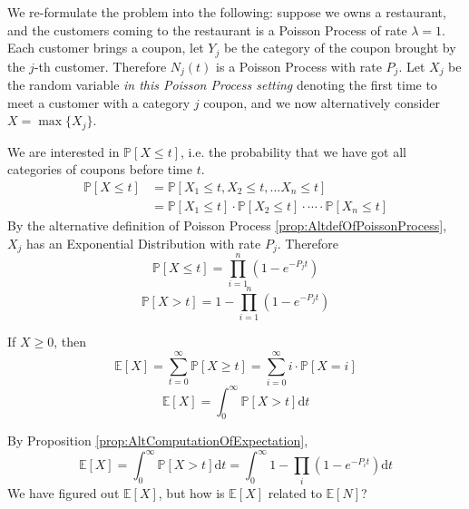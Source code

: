         We re-formulate the problem into the following: suppose we owns a restaurant, and the customers coming to the restaurant is a Poisson Process of rate $\lambda = 1$. Each customer brings a coupon, let $Y_j$ be the category of the coupon brought by the $j$-th customer. Therefore $N_j(t)$ is a Poisson Process with rate $P_j$. Let $X_j$ be the random variable \emph{in this Poisson Process setting} denoting the first time to meet a customer with a category $j$ coupon, and we now alternatively consider $X = \max \{X_j\}$.

        We are interested in $\mathbb{P}[X \le t]$, i.e. the probability that we have got all categories of coupons before time $t$.
        \begin{align*}
            \mathbb{P}[X \le t] &= \mathbb{P}[X_1 \le t, X_2 \le t, \dots X_n \le t]\\
            &= \mathbb{P}[X_1 \le t] \cdot \mathbb{P}[X_2 \le t] \cdot \cdots \cdot \mathbb{P}[X_n \le t]
        \end{align*}
        By the alternative definition of Poisson Process \ref{prop:AltdefOfPoissonProcess}, $X_j$ has an Exponential Distribution with rate $P_j$. Therefore
        \[ \mathbb{P}[X \le t] = \prod_{i=1}^n (1-e^{-P_jt}) \]
        \[ \mathbb{P}[X > t] = 1 - \prod_{i=1}^n (1-e^{-P_jt}) \]
        \begin{proposition}\label{prop:AltComputationOfExpectation}
            If $X \ge 0$, then
            \[ \mathbb{E}[X] = \sum_{t=0}^{\infty} \mathbb{P}[X \ge t] = \sum_{i=0}^{\infty}i\cdot\mathbb{P}[X=i] \]
            \[ \mathbb{E}[X] = \int_0^{\infty} \mathbb{P}[X > t]\mathrm{d}t\]
        \end{proposition}
        By Proposition \ref{prop:AltComputationOfExpectation},
        \[ \mathbb{E}[X] = \int_0^{\infty} \mathbb{P}[X > t]\mathrm{d}t = \int_0^{\infty}1 - \prod_i (1-e^{-P_it})\mathrm{d}t \]
        We have figured out $\mathbb{E}[X]$, but how is $\mathbb{E}[X]$ related to $\mathbb{E}[N]$?


